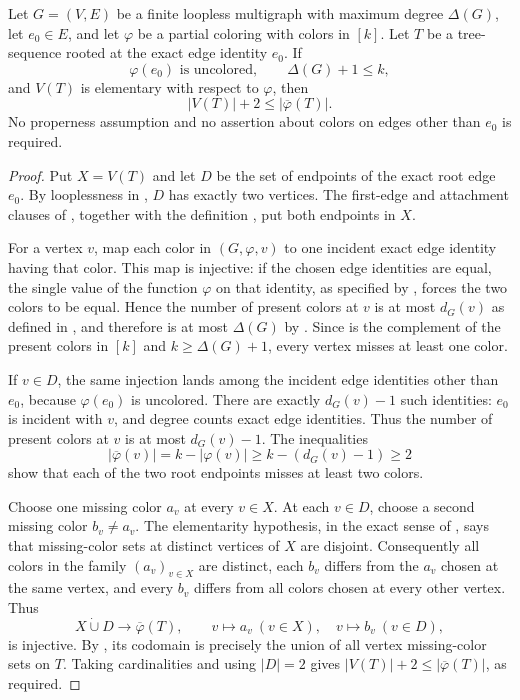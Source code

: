 \begin{lemma}
Let $G=(V,E)$ be a finite loopless multigraph with maximum degree
$\Delta(G)$, let $e_0\in E$, and let $\varphi$ be a partial coloring with
colors in $[k]$.  Let $T$ be a tree-sequence rooted at the exact edge
identity $e_0$.  If
\[
 \varphi(e_0)\text{ is uncolored},\qquad \Delta(G)+1\leq k,
\]
and $V(T)$ is elementary with respect to $\varphi$, then
\[
 |V(T)|+2\leq |\overline\varphi(T)|.
\]
No properness assumption and no assertion about colors on edges other than
$e_0$ is required.
\end{lemma}
\begin{proof}
Put $X=V(T)$ and let $D$ be the set of endpoints of the exact root edge
$e_0$.  By looplessness in , $D$ has exactly
two vertices.  The first-edge and attachment clauses of
, together with the definition
, put both endpoints in $X$.

For a vertex $v$, map each color in
$(G,\varphi,v)$ to one incident exact edge identity
having that color.  This map is injective: if the chosen edge identities
are equal, the single value of the function $\varphi$ on that identity,
as specified by ,
forces the two colors to be equal.  Hence the number of present colors at
$v$ is at most $d_G(v)$ as defined in , and therefore is
at most $\Delta(G)$ by .  Since
 is the complement of the present colors in
$[k]$ and $k\geq\Delta(G)+1$, every vertex misses at least one color.

If $v\in D$, the same injection lands among the incident edge identities
other than $e_0$, because $\varphi(e_0)$ is uncolored.  There are exactly
$d_G(v)-1$ such identities: $e_0$ is incident with $v$, and degree counts
exact edge identities.  Thus the number of present colors at $v$ is at
most $d_G(v)-1$.  The inequalities
\[
 |\overline\varphi(v)|
   =k-|\varphi(v)|
   \geq k-(d_G(v)-1)
   \geq 2
\]
show that each of the two root endpoints misses at least two colors.

Choose one missing color $a_v$ at every $v\in X$.  At each $v\in D$,
choose a second missing color $b_v\ne a_v$.  The elementarity hypothesis,
in the exact sense of , says that
missing-color sets at distinct vertices of $X$ are disjoint.  Consequently
all colors in the family $(a_v)_{v\in X}$ are distinct, each $b_v$ differs
from the $a_v$ chosen at the same vertex, and every $b_v$ differs from all
colors chosen at every other vertex.  Thus
\[
 X\mathbin{\dot\cup}D\longrightarrow
 \overline\varphi(T),\qquad
 v\mapsto a_v\ (v\in X),\quad v\mapsto b_v\ (v\in D),
\]
is injective.  By , its codomain is precisely
the union of all vertex missing-color sets on $T$.  Taking cardinalities
and using $|D|=2$ gives
$|V(T)|+2\leq|\overline\varphi(T)|$, as required.
\end{proof}
